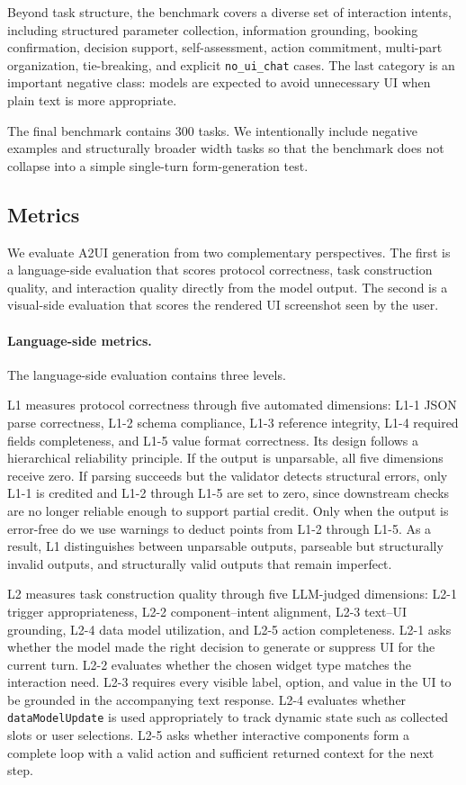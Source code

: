 Beyond task structure, the benchmark covers a diverse set of interaction intents, including structured parameter collection, information grounding, booking confirmation, decision support, self-assessment, action commitment, multi-part organization, tie-breaking, and explicit \texttt{no\_ui\_chat} cases. The last category is an important negative class: models are expected to avoid unnecessary UI when plain text is more appropriate.

The final benchmark contains 300 tasks. We intentionally include negative examples and structurally broader width tasks so that the benchmark does not collapse into a simple single-turn form-generation test.

\subsection{Metrics}
\label{subsec:metrics}

We evaluate A2UI generation from two complementary perspectives. The first is a language-side evaluation that scores protocol correctness, task construction quality, and interaction quality directly from the model output. The second is a visual-side evaluation that scores the rendered UI screenshot seen by the user.

\paragraph{Language-side metrics.}
The language-side evaluation contains three levels.

L1 measures protocol correctness through five automated dimensions: L1-1 JSON parse correctness, L1-2 schema compliance, L1-3 reference integrity, L1-4 required fields completeness, and L1-5 value format correctness. Its design follows a hierarchical reliability principle. If the output is unparsable, all five dimensions receive zero. If parsing succeeds but the validator detects structural errors, only L1-1 is credited and L1-2 through L1-5 are set to zero, since downstream checks are no longer reliable enough to support partial credit. Only when the output is error-free do we use warnings to deduct points from L1-2 through L1-5. As a result, L1 distinguishes between unparsable outputs, parseable but structurally invalid outputs, and structurally valid outputs that remain imperfect.

L2 measures task construction quality through five LLM-judged dimensions: L2-1 trigger appropriateness, L2-2 component--intent alignment, L2-3 text--UI grounding, L2-4 data model utilization, and L2-5 action completeness. L2-1 asks whether the model made the right decision to generate or suppress UI for the current turn. L2-2 evaluates whether the chosen widget type matches the interaction need. L2-3 requires every visible label, option, and value in the UI to be grounded in the accompanying text response. L2-4 evaluates whether \texttt{dataModelUpdate} is used appropriately to track dynamic state such as collected slots or user selections. L2-5 asks whether interactive components form a complete loop with a valid action and sufficient returned context for the next step.

